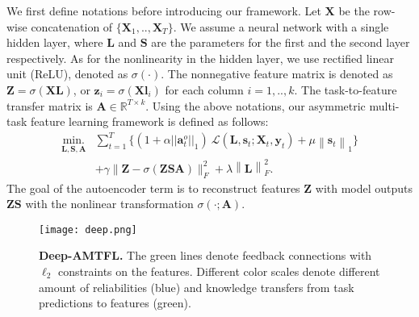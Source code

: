 \documentclass{article}
\newcommand{\vct}[1]{\boldsymbol{#1}} %
\newcommand{\mat}[1]{\boldsymbol{#1}} %
\newcommand{\norm}[1]{\left\|#1\right\|}
\begin{document}
	We first define notations before introducing our framework. Let $\mat{X}$ be the row-wise concatenation of $\{\mat{X}_1,..,\mat{X}_T\}$. We assume a neural network with a single hidden layer, where $\mat{L}$ and $\mat{S}$ are the parameters for the first and the second layer respectively. As for the nonlinearity in the hidden layer, we use rectified linear unit (ReLU), denoted as $\sigma(\cdot)$. The nonnegative feature matrix is denoted as $\mat{Z} = \sigma(\mat{XL})$, or $\vct{z}_i = \sigma(\mat{X}\vct{l}_i)$ for each column $i=1,..,k$. The task-to-feature transfer matrix is $\mat{A} \in \mathbb{R}^{T \times k}$. Using the above notations, our asymmetric multi-task feature learning framework is defined as follows:
	\begin{align}
	\operatorname*{min.}_{\mat{L},\mat{S}, \mat{A}} & \sum_{t=1}^T \Big\{(1+\alpha ||\vct{a}_t^o||_1)\ \mathcal{L}(\mat{L},\vct{s}_t; \mat{X}_t, \vct{y}_t) + \mu \norm{\vct{s}_t}_1 \Big\} \nonumber\\
	&+ \gamma \|\mat{Z}-\sigma(\mat{Z}\mat{S}\mat{A})\|_{F}^2 + \lambda \norm{\mat{L}}_F^2. \label{eq:amtfl_shallow}
	\end{align}
	The goal of the autoencoder term is to reconstruct features $\mat{Z}$ with model outputs $\mat{ZS}$ with the nonlinear transformation $\sigma(\cdot ; \mat{A})$. 
	\begin{figure}
		\begin{center}
			\texttt{[image: deep.png]}
		\end{center}
		\vspace{-0.1in}
		\caption{\small \textbf{Deep-AMTFL.} The green lines denote feedback connections with $\ell_{2}$ constraints on the features. Different color scales denote different amount of reliabilities (blue) and knowledge transfers from task predictions to features (green).}\label{deep}
		\vspace{-0.1in}
	\end{figure}
	
\end{document}
